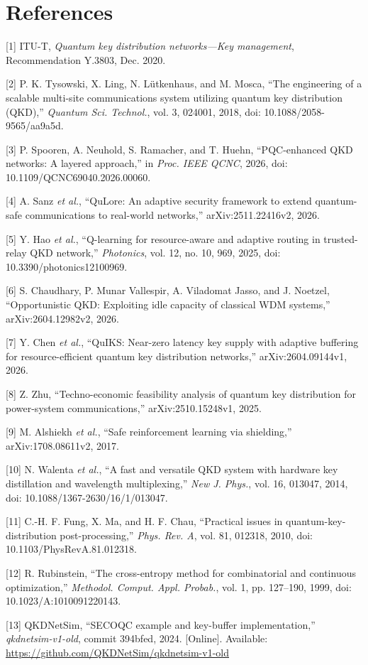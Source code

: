 \documentclass[conference,a4paper]{IEEEtran}
\begin{document}
\section*{References}

[1] ITU-T, \emph{Quantum key distribution networks---Key management}, Recommendation Y.3803, Dec. 2020.

[2] P. K. Tysowski, X. Ling, N. L\"utkenhaus, and M. Mosca, ``The engineering of a scalable multi-site communications system utilizing quantum key distribution (QKD),'' \emph{Quantum Sci. Technol.}, vol. 3, 024001, 2018, doi: 10.1088/2058-9565/aa9a5d.

[3] P. Spooren, A. Neuhold, S. Ramacher, and T. Huehn, ``PQC-enhanced QKD networks: A layered approach,'' in \emph{Proc. IEEE QCNC}, 2026, doi: 10.1109/QCNC69040.2026.00060.

[4] A. Sanz \emph{et al.}, ``QuLore: An adaptive security framework to extend quantum-safe communications to real-world networks,'' arXiv:2511.22416v2, 2026.

[5] Y. Hao \emph{et al.}, ``Q-learning for resource-aware and adaptive routing in trusted-relay QKD network,'' \emph{Photonics}, vol. 12, no. 10, 969, 2025, doi: 10.3390/photonics12100969.

[6] S. Chaudhary, P. Munar Vallespir, A. Viladomat Jasso, and J. Noetzel, ``Opportunistic QKD: Exploiting idle capacity of classical WDM systems,'' arXiv:2604.12982v2, 2026.

[7] Y. Chen \emph{et al.}, ``QuIKS: Near-zero latency key supply with adaptive buffering for resource-efficient quantum key distribution networks,'' arXiv:2604.09144v1, 2026.

[8] Z. Zhu, ``Techno-economic feasibility analysis of quantum key distribution for power-system communications,'' arXiv:2510.15248v1, 2025.

[9] M. Alshiekh \emph{et al.}, ``Safe reinforcement learning via shielding,'' arXiv:1708.08611v2, 2017.

[10] N. Walenta \emph{et al.}, ``A fast and versatile QKD system with hardware key distillation and wavelength multiplexing,'' \emph{New J. Phys.}, vol. 16, 013047, 2014, doi: 10.1088/1367-2630/16/1/013047.

[11] C.-H. F. Fung, X. Ma, and H. F. Chau, ``Practical issues in quantum-key-distribution post-processing,'' \emph{Phys. Rev. A}, vol. 81, 012318, 2010, doi: 10.1103/PhysRevA.81.012318.

[12] R. Rubinstein, ``The cross-entropy method for combinatorial and continuous optimization,'' \emph{Methodol. Comput. Appl. Probab.}, vol. 1, pp. 127--190, 1999, doi: 10.1023/A:1010091220143.

[13] QKDNetSim, ``SECOQC example and key-buffer implementation,'' \emph{qkdnetsim-v1-old}, commit 394bfed, 2024. [Online]. Available: \url{https://github.com/QKDNetSim/qkdnetsim-v1-old}
\end{document}
